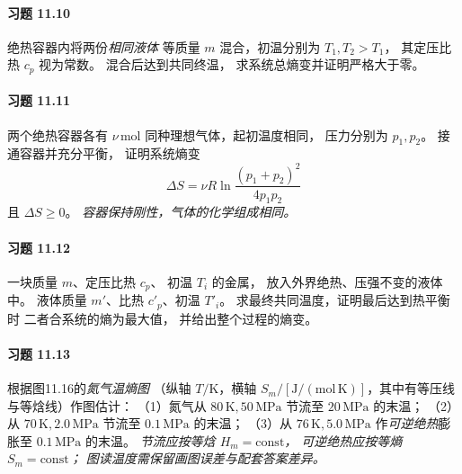 \paragraph{习题 11.10}
绝热容器内将两份\emph{相同液体}
等质量 \(m\) 混合，初温分别为
\(T_1,T_2>T_1\)，
其定压比热 \(c_p\) 视为常数。
混合后达到共同终温，
求系统总熵变并证明严格大于零。

\paragraph{习题 11.11}
两个绝热容器各有 \(\nu\,\mathrm{mol}\)
同种理想气体，起初温度相同，
压力分别为 \(p_1,p_2\)。
接通容器并充分平衡，
证明系统熵变
\[
 \Delta S=\nu R
 \ln\frac{(p_1+p_2)^2}{4p_1p_2}
\]
且 \(\Delta S\ge0\)。
\textit{容器保持刚性，气体的化学组成相同。}

\paragraph{习题 11.12}
一块质量 \(m\)、定压比热 \(c_p\)、
初温 \(T_i\) 的金属，
放入外界绝热、压强不变的液体中。
液体质量 \(m'\)、比热 \(c'_p\)、初温 \(T'_i\)。
求最终共同温度，证明最后达到热平衡时
二者合系统的熵为最大值，
并给出整个过程的熵变。

\paragraph{习题 11.13}
根据图11.16的\emph{氮气温熵图}
（纵轴 \(T/\mathrm K\)，横轴
\(S_m/[\mathrm{J/(mol\,K)}]\)，其中有等压线
与等焓线）作图估计：
（1）氮气从 \(80\,\mathrm K,50\,\mathrm{MPa}\)
节流至 \(20\,\mathrm{MPa}\) 的末温；
（2）从 \(70\,\mathrm K,2.0\,\mathrm{MPa}\)
节流至 \(0.1\,\mathrm{MPa}\) 的末温；
（3）从 \(76\,\mathrm K,5.0\,\mathrm{MPa}\)
作\emph{可逆绝热}膨胀至
\(0.1\,\mathrm{MPa}\) 的末温。
\textit{节流应按等焓 \(H_m=\mathrm{const}\)，
可逆绝热应按等熵 \(S_m=\mathrm{const}\)；
图读温度需保留画图误差与配套答案差异。}
